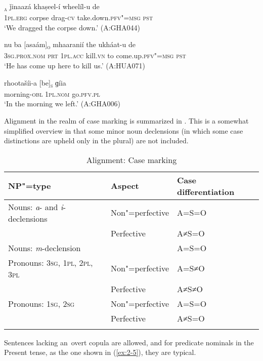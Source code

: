 \begin{exe}
\ex
\label{ex:2-2a}
\gll [asím]\textsubscript{\textsc{a}} ǰinaazá khaṣeel-í wheelíl-u de \\
\textsc{1pl.erg} corpse drag-\textsc{cv} take.down.\textsc{pfv"=msg} \textsc{pst}  \\
\glt `We dragged the corpse down.' (A:GHA044)

\ex
\label{ex:2-2b}
\gll nu ba [asaám]\textsubscript{\textsc{o}} mhaaranií the ukháat-u de \\
\textsc{3sg.prox.nom} \textsc{prt} \textsc{1pl.acc} kill.\textsc{vn} to come.up.\textsc{pfv"=msg} \textsc{pst}  \\
\glt `He has come up here to kill us.' (A:HUA071)

\ex
\label{ex:2-2c}
\gll rhootašíi-a [be]\textsubscript{\textsc{s}} ɡíia  \\
morning-\textsc{obl} \textsc{1pl.nom} go.\textsc{pfv.pl}  \\
\glt `In the morning we left.' (A:GHA006)
\end{exe}


Alignment in the realm of case marking is summarized in . This is a somewhat simplified overview in that some minor noun declensions (in which some case distinctions are upheld only in the plural) are not included.


\begin{table}[ht]
\caption{Alignment: Case marking}
\begin{tabularx}{\textwidth}{ l l Q }
\lsptoprule
NP"=type &
Aspect &
Case differentiation\\\hline
Nouns: \textit{a}- and \textit{i}-declensions &
Non"=perfective &
A=S=O \\
&
Perfective &
A≠S=O \\
Nouns: \textit{m}-declension &
&
A=S=O \\
Pronouns: \textsc{3sg, 1pl, 2pl, 3pl} &
Non"=perfective &
A=S≠O \\
&
Perfective &
A≠S≠O \\  
Pronouns: \textsc{1sg, 2sg} &
Non"=perfective &
A=S=O \\
&
Perfective &
A≠S=O
\\\lspbottomrule
\end{tabularx}
\label{tab:2-casealign}
\end{table}


Sentences lacking an~overt copula are allowed, and for predicate nominals in the Present tense, as the one shown in (\ref{ex:2-5}), they are typical.

